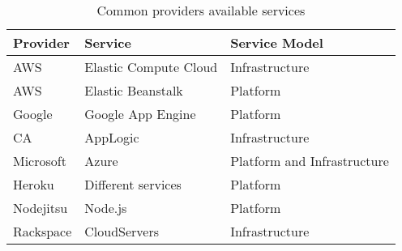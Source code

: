\begin{table}
  \begin{center}
    \caption{Common providers available services}
    \begin{tabular}{ | l | l | l | }
      \hline
      \textbf{Provider} & \textbf{Service} & \textbf{Service Model} \\ \hline
      AWS & Elastic Compute Cloud & Infrastructure \\ \hline
      AWS & Elastic Beanstalk & Platform \\ \hline
      Google & Google App Engine & Platform \\ \hline
      CA & AppLogic & Infrastructure \\ \hline
      Microsoft & Azure & Platform and Infrastructure \\ \hline
      Heroku & Different services & Platform \\ \hline
      Nodejitsu & Node.js & Platform \\ \hline
      Rackspace & CloudServers & Infrastructure \\ \hline
    \end{tabular}
  \end{center}
  \label{table:providerservices}
\end{table}

